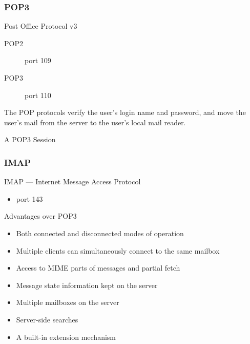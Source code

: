 \begin{frame}
  \begin{center}
  \end{center}
  \label{fig:smtp-pop3}
\end{frame}

\subsubsection{POP3}

\begin{frame}{Post Office Protocol v3}
  \begin{minipage}{.7\linewidth}
    \begin{description}
    \item[POP2] port 109
    \item[POP3] port 110
    \end{description}
    The POP protocols verify the user's login name and password, and move the user's mail
    from the server to the user's local mail reader.
  \end{minipage}\hfill
  \begin{minipage}{.25\linewidth}
    \begin{iblock}{A POP3 Session}
      \centering
      \mode<beamer>{ \texttt{[image: pop3\_session]} }%
      \label{fig:pop3_session}
    \end{iblock}
  \end{minipage}
\end{frame}
  
\subsubsection{IMAP}

\begin{frame}{IMAP --- Internet Message Access Protocol}
  \begin{itemize}
  \item port 143
  \end{itemize}
  \begin{iblock}{Advantages over POP3}
    \begin{itemize}
    \item Both connected and disconnected modes of operation
    \item Multiple clients can simultaneously connect to the same mailbox
    \item Access to MIME parts of messages and partial fetch
    \item Message state information kept on the server
    \item Multiple mailboxes on the server
    \item Server-side searches
    \item A built-in extension mechanism
    \end{itemize}
  \end{iblock}
\end{frame}


